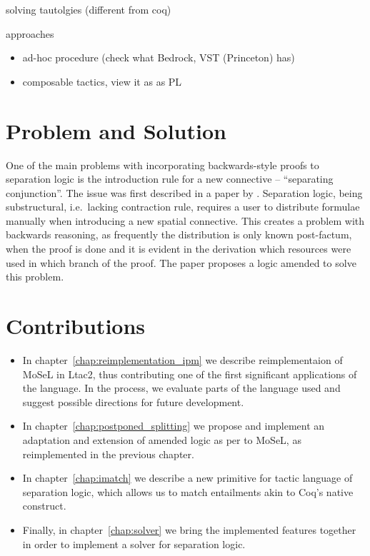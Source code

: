 solving tautolgies (different from coq)

approaches
  \begin{itemize}
  \item ad-hoc procedure (check what Bedrock, VST (Princeton) has)
  \item composable tactics, view it as as PL
  \end{itemize}


\section{Problem and Solution}
\label{sec:problem-solution}

One of the main problems with incorporating backwards-style proofs to separation logic is the introduction rule for a new connective -- ``separating conjunction''.
The issue was first described in a paper by \citet{harlandResourceDistributionBooleanConstraints2003}.
Separation logic, being substructural, i.e.\ lacking contraction rule, requires a user to distribute formulae manually when introducing a new spatial connective.
This creates a problem with backwards reasoning, as frequently the distribution is only known post-factum, when the proof is done and it is evident in the derivation which resources were used in which branch of the proof.
The paper proposes a logic amended to solve this problem.

  
\section{Contributions}
\label{sec:contributions}

\begin{itemize}
\item In chapter~\ref{chap:reimplementation_ipm} we describe reimplementaion of MoSeL in Ltac2, thus contributing one of the first significant applications of the language.
  In the process, we evaluate parts of the language used and suggest possible directions for future development.
\item In chapter~\ref{chap:postponed_splitting} we propose and implement an adaptation and extension of amended logic as per \cite{harlandResourceDistributionBooleanConstraints2003} to MoSeL, as reimplemented in the previous chapter.
\item In chapter~\ref{chap:imatch} we describe a new primitive for tactic language of separation logic, which allows us to match entailments akin to Coq's native  construct.
\item Finally, in chapter~\ref{chap:solver} we bring the implemented features together in order to implement a solver for separation logic.
\end{itemize}

